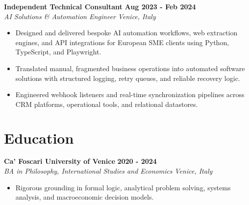 \documentclass[10pt,a4paper]{article}
\newcommand{\role}[4]{%
  \textbf{#1} \hfill \textbf{#2}\\[1pt]%
  \textit{#3} \hfill \textit{#4}\\[2pt]%
}
\begin{document}
\role{Independent Technical Consultant}{Aug 2023 - Feb 2024}{AI Solutions \& Automation Engineer}{Venice, Italy}
\begin{itemize}
  \item Designed and delivered bespoke AI automation workflows, web extraction engines, and API integrations for European SME clients using Python, TypeScript, and Playwright.
  \item Translated manual, fragmented business operations into automated software solutions with structured logging, retry queues, and reliable recovery logic.
  \item Engineered webhook listeners and real-time synchronization pipelines across CRM platforms, operational tools, and relational datastores.
\end{itemize}

\section{Education}
\role{Ca' Foscari University of Venice}{2020 - 2024}{BA in Philosophy, International Studies and Economics}{Venice, Italy}
\begin{itemize}
  \item Rigorous grounding in formal logic, analytical problem solving, systems analysis, and macroeconomic decision models.
\end{itemize}
\end{document}
